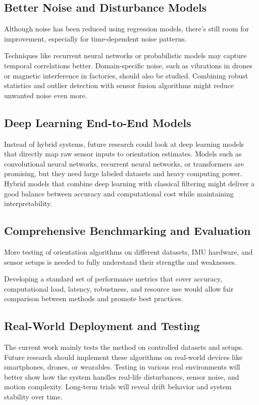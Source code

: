 \documentclass{iutbscthesis}
\begin{document}
\subsection{Better Noise and Disturbance Models}

Although noise has been reduced using regression models, there's still room for improvement, especially for time-dependent noise patterns.

Techniques like recurrent neural networks or probabilistic models may capture temporal correlations better. Domain-specific noise, such as vibrations in drones or magnetic interference in factories, should also be studied. Combining robust statistics and outlier detection with sensor fusion algorithms might reduce unwanted noise even more.

\subsection{Deep Learning End-to-End Models}

Instead of hybrid systems, future research could look at deep learning models that directly map raw sensor inputs to orientation estimates. Models such as convolutional neural networks, recurrent neural networks, or transformers are promising, but they need large labeled datasets and heavy computing power. Hybrid models that combine deep learning with classical filtering might deliver a good balance between accuracy and computational cost while maintaining interpretability.

\subsection{Comprehensive Benchmarking and Evaluation}

More testing of orientation algorithms on different datasets, IMU hardware, and sensor setups is needed to fully understand their strengths and weaknesses.

Developing a standard set of performance metrics that cover accuracy, computational load, latency, robustness, and resource use would allow fair comparison between methods and promote best practices.

\subsection{Real-World Deployment and Testing}

The current work mainly tests the method on controlled datasets and setups. Future research should implement these algorithms on real-world devices like smartphones, drones, or wearables. Testing in various real environments will better show how the system handles real-life disturbances, sensor noise, and motion complexity. Long-term trials will reveal drift behavior and system stability over time.
\end{document}
